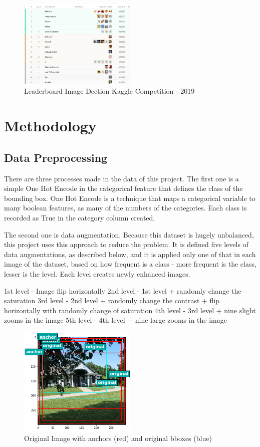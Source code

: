 \documentclass[11pt, a4paper, twocolumn]{article}
\begin{document}
\begin{figure}[!ht]
	\centering
	\includegraphics[width=0.5\textwidth]{leaderboard.png}
	\caption{\scriptsize Leaderboard Image Dection Kaggle Competition - 2019}
\end{figure}

\section{Methodology}

\subsection{Data Preprocessing}

There are three processes made in the data of this project. The first one is a simple One Hot Encode in the categorical feature that defines the class of the bounding box. One Hot Encode is a technique that maps a categorical variable to many boolean features, as many of the numbers of the categories. Each class is recorded as True in the category column created.

The second one is data augmentation. Because this dataset is hugely unbalanced, this project uses this approach to reduce the problem. It is defined five levels of data augmentations, as described below, and it is applied only one of that in each image of the dataset, based on how frequent is a class - more frequent is the class, lesser is the level. Each level creates newly enhanced images.

1st level - Image flip horizontally
2nd level - 1st level + randomly change the saturation 
3rd level - 2nd level + randomly change the contrast + flip horizontally with randomly change of saturation 
4th level - 3rd level + nine slight zooms in the image
5th level - 4th level + nine large zooms in the image

\begin{figure}[!ht]
	\centering
	\includegraphics[width=0.5\textwidth]{original-img.png}
	\caption{\scriptsize Original Image with anchors (red) and original bboxes (blue)}
	\label{original}
\end{figure}
\end{document}

